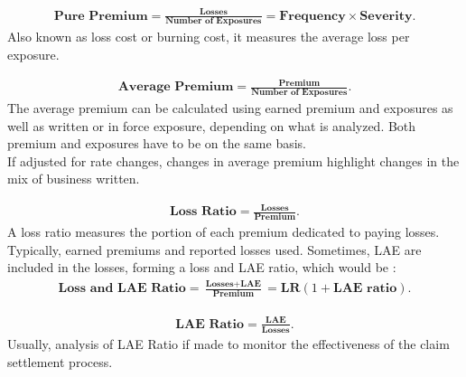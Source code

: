 \documentclass[11pt, english]{memoir}
\numberwithin{definition}{section}
\begin{document}
\begin{tcolorbox}[adjusted title = \textbf{Pure Premium}, boxrule = 0mm]
\begin{align*}
\textbf{Pure Premium} = \frac{\textbf{Losses}}{\textbf{Number of Exposures}} = \textbf{Frequency} \times \textbf{Severity}.
\end{align*}
Also known as loss cost or burning cost, it measures the average loss per exposure.  
\end{tcolorbox}


\begin{tcolorbox}[adjusted title = \textbf{Average Premium}, boxrule = 0mm]
\begin{align*}
\textbf{Average Premium} = \frac{\textbf{Premium}}{\textbf{Number of Exposures}}.
\end{align*}
The average premium can be calculated using earned premium and exposures as well as written or in force exposure, depending on what is analyzed. Both premium and exposures have to be on the same basis. \\

If adjusted for rate changes, changes in average premium highlight changes in the mix of business written. 
\end{tcolorbox}


\begin{tcolorbox}[adjusted title = \textbf{Loss Ratio}, boxrule = 0mm]
\begin{align*}
\textbf{Loss Ratio} = \frac{\textbf{Losses}}{\textbf{Premium}}.
\end{align*}
A loss ratio measures the portion of each premium dedicated to paying losses. Typically, earned premiums and reported losses used. Sometimes, LAE are included in the losses, forming a loss and LAE ratio, which would be : 
\begin{align*}
\textbf{Loss and LAE Ratio} = \frac{\textbf{Losses} + \textbf{LAE}}{\textbf{Premium}} = \textbf{LR}(1+\textbf{LAE ratio}).
\end{align*}
\end{tcolorbox}


\begin{tcolorbox}[adjusted title = \textbf{Loss Adjustment Ratio}, boxrule = 0mm]
\begin{align*}
\textbf{LAE Ratio} = \frac{\textbf{LAE}}{\textbf{Losses}} .
\end{align*}
Usually, analysis of LAE Ratio if made to monitor the effectiveness of the claim settlement process. 
\end{tcolorbox}
\end{document}
